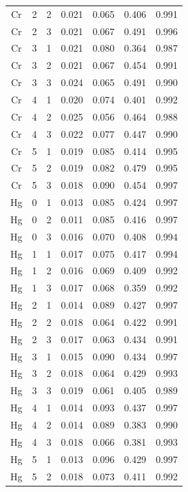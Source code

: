 \documentclass[ms, hidelinks]{uncgdissertationexp3}
\theoremstyle{plain}
\theoremstyle{definition}
\theoremstyle{remark}
\begin{document}
\begin{longtable}{ccccccc}
  Cr & 2 & 2 & 0.021 & 0.065 & 0.406 & 0.991\\
  \rowcolor{gray!6}  Cr & 2 & 3 & 0.021 & 0.067 & 0.491 & 0.996\\
  Cr & 3 & 1 & 0.021 & 0.080 & 0.364 & 0.987\\
  \rowcolor{gray!6}  Cr & 3 & 2 & 0.021 & 0.067 & 0.454 & 0.991\\
  Cr & 3 & 3 & 0.024 & 0.065 & 0.491 & 0.990\\
  \rowcolor{gray!6}  Cr & 4 & 1 & 0.020 & 0.074 & 0.401 & 0.992\\
  Cr & 4 & 2 & 0.025 & 0.056 & 0.464 & 0.988\\
  \rowcolor{gray!6}  Cr & 4 & 3 & 0.022 & 0.077 & 0.447 & 0.990\\
  Cr & 5 & 1 & 0.019 & 0.085 & 0.414 & 0.995\\
  \rowcolor{gray!6}  Cr & 5 & 2 & 0.019 & 0.082 & 0.479 & 0.995\\
  Cr & 5 & 3 & 0.018 & 0.090 & 0.454 & 0.997\\
  \rowcolor{gray!6}  Hg & 0 & 1 & 0.013 & 0.085 & 0.424 & 0.997\\
  Hg & 0 & 2 & 0.011 & 0.085 & 0.416 & 0.997\\
  \rowcolor{gray!6}  Hg & 0 & 3 & 0.016 & 0.070 & 0.408 & 0.994\\
  Hg & 1 & 1 & 0.017 & 0.075 & 0.417 & 0.994\\
  \rowcolor{gray!6}  Hg & 1 & 2 & 0.016 & 0.069 & 0.409 & 0.992\\
  Hg & 1 & 3 & 0.017 & 0.068 & 0.359 & 0.992\\
  \rowcolor{gray!6}  Hg & 2 & 1 & 0.014 & 0.089 & 0.427 & 0.997\\
  Hg & 2 & 2 & 0.018 & 0.064 & 0.422 & 0.991\\
  \rowcolor{gray!6}  Hg & 2 & 3 & 0.017 & 0.063 & 0.434 & 0.991\\
  Hg & 3 & 1 & 0.015 & 0.090 & 0.434 & 0.997\\
  \rowcolor{gray!6}  Hg & 3 & 2 & 0.018 & 0.064 & 0.429 & 0.993\\
  Hg & 3 & 3 & 0.019 & 0.061 & 0.405 & 0.989\\
  \rowcolor{gray!6}  Hg & 4 & 1 & 0.014 & 0.093 & 0.437 & 0.997\\
  Hg & 4 & 2 & 0.014 & 0.089 & 0.383 & 0.990\\
  \rowcolor{gray!6}  Hg & 4 & 3 & 0.018 & 0.066 & 0.381 & 0.993\\
  Hg & 5 & 1 & 0.013 & 0.096 & 0.429 & 0.997\\
  \rowcolor{gray!6}  Hg & 5 & 2 & 0.018 & 0.073 & 0.411 & 0.992\\

\end{longtable}
\end{document}
